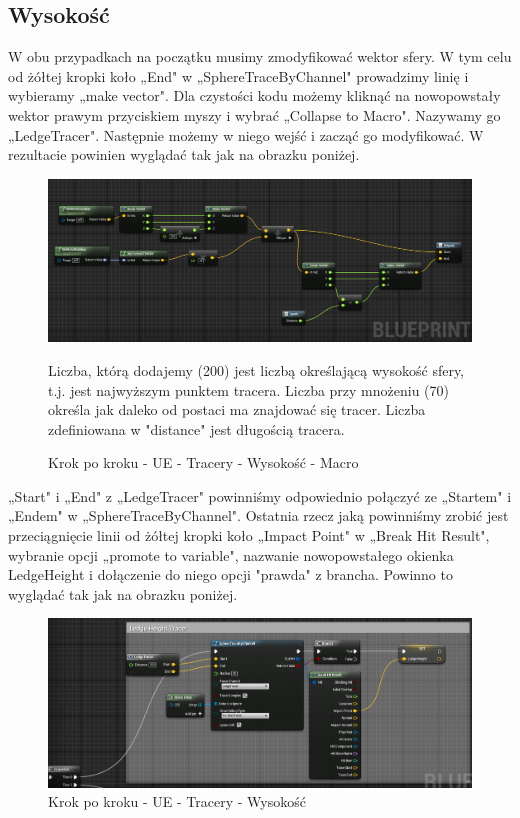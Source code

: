 \documentclass[openright]{xmgr}
\begin{document}
\subsection{Wysokość}

W obu przypadkach na początku musimy zmodyfikować wektor sfery. W tym celu od żółtej kropki koło „End" w „SphereTraceByChannel" prowadzimy linię i wybieramy „make vector". Dla czystości kodu możemy kliknąć na nowopowstały wektor prawym przyciskiem myszy i wybrać „Collapse to Macro". Nazywamy go „LedgeTracer". Następnie możemy w niego wejść i zacząć go modyfikować. W rezultacie powinien wyglądać tak jak na obrazku poniżej.

\begin{figure}[!htb]
    \begin{center}
    \includegraphics[scale=0.4]{Screeny/UeKrokPoKroku/UE-HeightMacro}
    \end{center}
    \caption{Krok po kroku - UE - Tracery - Wysokość - Macro}
    Liczba, którą dodajemy (200) jest liczbą określającą wysokość sfery, t.j. jest najwyższym punktem tracera. Liczba przy mnożeniu (70) określa jak daleko od postaci ma znajdować się tracer. Liczba zdefiniowana w "distance" jest długością tracera.
\end{figure}
\newpage
„Start" i „End" z „LedgeTracer" powinniśmy odpowiednio połączyć ze „Startem" i „Endem" w „SphereTraceByChannel". Ostatnia rzecz jaką powinniśmy zrobić jest przeciągnięcie linii od żółtej kropki koło „Impact Point" w „Break Hit Result", wybranie opcji „promote to variable", nazwanie nowopowstałego okienka LedgeHeight i dołączenie do niego opcji "prawda" z brancha. Powinno to wyglądać tak jak na obrazku poniżej.

\begin{figure}[!htb]
    \begin{center}
    \includegraphics[scale=0.5]{Screeny/UeKrokPoKroku/UE-Height}
    \end{center}
    \caption{Krok po kroku - UE - Tracery - Wysokość}
\end{figure}
\newpage
\end{document}
